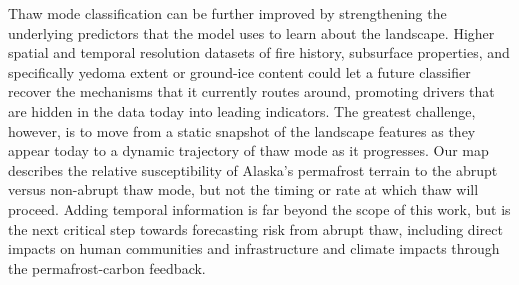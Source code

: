 \documentclass[../main.tex]{subfiles}
\begin{document}
Thaw mode classification can be further improved by strengthening the underlying predictors that the model uses to learn about the landscape. Higher spatial and temporal resolution datasets of fire history, subsurface properties, and specifically yedoma extent or ground-ice content could let a future classifier recover the mechanisms that it currently routes around, promoting drivers that are hidden in the data today into leading indicators. The greatest challenge, however, is to move from a static snapshot of the landscape features as they appear today to a dynamic trajectory of thaw mode as it progresses. Our map describes the relative susceptibility of Alaska's permafrost terrain to the abrupt versus non-abrupt thaw mode, but not the timing or rate at which thaw will proceed. Adding temporal information is far beyond the scope of this work, but is the next critical step towards forecasting risk from abrupt thaw, including direct impacts on human communities and infrastructure and climate impacts through the permafrost-carbon feedback.
\end{document}
